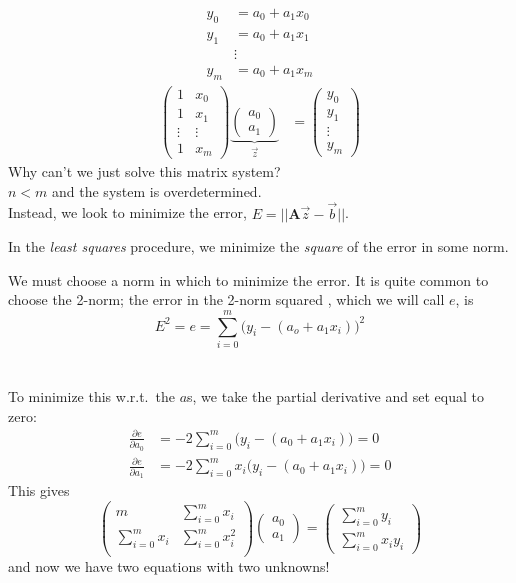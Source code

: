 \documentclass[12pt, answers]{exam}
\newcommand{\ve}[1]{\ensuremath{\mathbf{#1}}}
\begin{document}
\begin{align}
y_0 &= a_0 + a_1 x_0 \nonumber \\
y_1 &= a_0 + a_1 x_1 \nonumber\\
& \vdots \nonumber\\
y_m &= a_0 + a_1 x_m \nonumber
%
\end{align}
\begin{align*}
\begin{pmatrix}
1 & x_0 \\ 1 & x_1 \\ \vdots & \vdots \\ 1 & x_m
\end{pmatrix}
\underbrace{\begin{pmatrix}
a_0 \\ a_1
\end{pmatrix}}_{\vec{z}} &=
\begin{pmatrix}
y_0 \\ y_1 \\ \vdots \\ y_m
\end{pmatrix}
\end{align*}
%
Why can't we just solve this matrix system?\\ $n < m$ and the system is overdetermined.\\ Instead, we look to minimize the error, $E = ||\ve{A}\vec{z} - \vec{b}||$.

In the \textit{least squares} procedure, we minimize the \textit{square} of the error in some norm. 

We must choose a norm in which to minimize the error. It is quite common to choose the 2-norm; the error in the 2-norm squared , which we will call $e$, is
\ifprintanswers
\[E^2 = e = \sum_{i=0}^m \bigl(y_i - (a_o + a_1 x_i)\bigr)^2\]
\else
\\ \vspace*{3em}\\
\fi
%
To minimize this w.r.t.\ the $a$s, we take the partial derivative and set equal to zero:
%
\begin{align}
\frac{\partial e}{\partial a_0} &= -2 \sum_{i=0}^m \bigl(y_i - (a_0 + a_1 x_i)\bigr) = 0 \nonumber\\
%
\frac{\partial e}{\partial a_1} &= -2 \sum_{i=0}^m x_i \bigl(y_i - (a_0 + a_1 x_i)\bigr) = 0 \nonumber
\end{align}
%
This gives
%
\begin{equation}
\begin{pmatrix}
m                & \sum_{i=0}^m x_i \nonumber\\
\sum_{i=0}^m x_i & \sum_{i=0}^m x_i^2 \nonumber\\ 
\end{pmatrix}
\begin{pmatrix}
a_0 \\ a_1
\end{pmatrix} =
\begin{pmatrix}
\sum_{i=0}^m y_i \\ \sum_{i=0}^m x_i y_i
\end{pmatrix}\nonumber
\end{equation}
%
and now we have two equations with two unknowns! 
\end{document}
